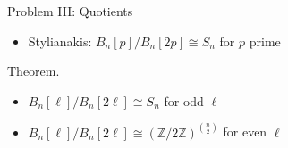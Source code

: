 \documentclass[final]{beamer}
\newcommand{\Z}{\mathbb{Z}}
\newlength{\sepwidth}
\newlength{\colwidth}
\newcommand{\separatorcolumn}{\begin{column}{\sepwidth}\end{column}}
\begin{document}
\begin{frame}[t]
\begin{columns}[t]
\begin{column}{\colwidth}
\begin{block}{
  \begin{huge}
  \vspace*{5mm} 
    Problem III:   Quotients
  \end{huge}}
\begin{huge}
\begin{itemize}
  \item[] Stylianakis: $B_n[p] / B_n[2p] \cong S_n$ for $p$ prime 
  \end{itemize}
    \end{huge} \vspace*{-7mm}

{\bf{ \begin{huge} Theorem. \end{huge}} }
\begin{huge}
\vspace*{-7mm}
\begin{itemize} 
\item[] $B_n[\ell] / B_n[2\ell] \cong S_n$ for odd $\ell$

        
\item[] $B_n[\ell] / B_n[2\ell] \cong (\Z /2\Z)^{{n\choose 2}}$ for even $\ell$
  
\end{itemize}
\end{huge}

  \end{block} 
\begin{Large}

  
\end{Large}



\end{column}

\separatorcolumn
\end{columns}
\end{frame}
\end{document}
